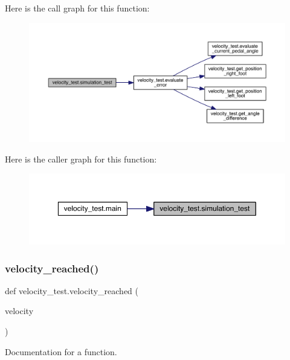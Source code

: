 Here is the call graph for this function\+:\nopagebreak
\begin{figure}[H]
\begin{center}
\leavevmode
\includegraphics[width=350pt]{namespacevelocity__test_a3abe39643659ed5bf979398a5b0cec6d_cgraph}
\end{center}
\end{figure}
Here is the caller graph for this function\+:\nopagebreak
\begin{figure}[H]
\begin{center}
\leavevmode
\includegraphics[width=350pt]{namespacevelocity__test_a3abe39643659ed5bf979398a5b0cec6d_icgraph}
\end{center}
\end{figure}
\mbox{\label{namespacevelocity__test_a125db86a88728cf91ab4383613e22cd1}} 
\subsubsection{\texorpdfstring{velocity\_reached()}{velocity\_reached()}}
{\footnotesize\ttfamily def velocity\+\_\+test.\+velocity\+\_\+reached (\begin{DoxyParamCaption}\item[{}]{velocity }\end{DoxyParamCaption})}



Documentation for a function. 

